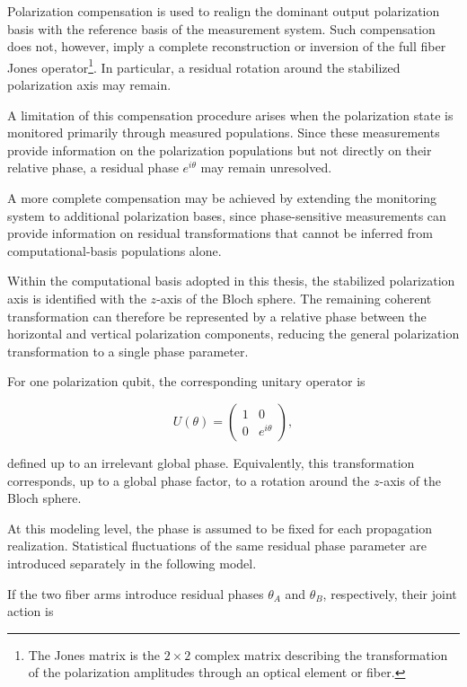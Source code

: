 Polarization compensation is used to realign the dominant output polarization
basis with the reference basis of the measurement system. Such compensation does
not, however, imply a complete reconstruction or inversion of the full fiber Jones
operator\footnote{The Jones matrix is the \(2\times2\) complex matrix describing
the transformation of the polarization amplitudes through an optical element or
fiber.}. In particular, a residual rotation around the stabilized polarization
axis may remain.

A limitation of this compensation procedure arises when the polarization state is
monitored primarily through measured populations. Since these measurements provide
information on the polarization populations but not directly on their relative
phase, a residual phase \(e^{i\theta}\) may remain unresolved.

A more complete compensation may be achieved by extending the monitoring system
to additional polarization bases, since phase-sensitive measurements can provide
information on residual transformations that cannot be inferred from
computational-basis populations alone.

Within the computational basis adopted in this thesis, the stabilized polarization
axis is identified with the \(z\)-axis of the Bloch sphere. The remaining coherent
transformation can therefore be represented by a relative phase between the
horizontal and vertical polarization components, reducing the general polarization
transformation to a single phase parameter.

For one polarization qubit, the corresponding unitary operator is

\begin{equation}
U(\theta)
=
\begin{pmatrix}
1 & 0\\
0 & e^{i\theta}
\end{pmatrix},
\label{eq:single_qubit_residual_phase_unitary}
\end{equation}

defined up to an irrelevant global phase. Equivalently, this transformation
corresponds, up to a global phase factor, to a rotation around the \(z\)-axis of
the Bloch sphere.

At this modeling level, the phase is assumed to be fixed for each propagation
realization. Statistical fluctuations of the same residual phase parameter are
introduced separately in the following model.

If the two fiber arms introduce residual phases \( \theta_A \) and \( \theta_B \),
respectively, their joint action is

